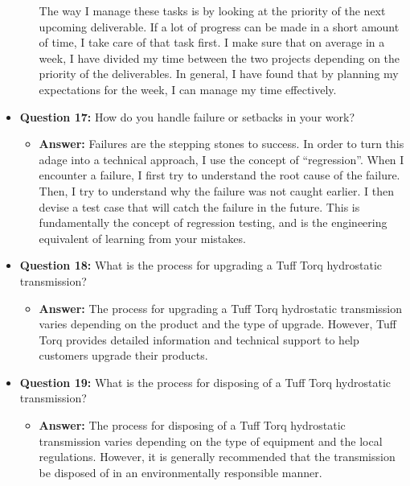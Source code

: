 \documentclass{article}
\begin{document}
\begin{itemize}
\begin{itemize}
        The way I manage these tasks is by looking at the priority of the next upcoming
        deliverable. If a lot of progress can be made in a short amount of time, I take
        care of that task first. I make sure that on average in a week, I have divided
        my time between the two projects depending on the priority of the deliverables.
        In general, I have found that by planning my expectations for the week, I can
        manage my time effectively.\\
    \end{itemize}
    
    \item \textbf{Question 17:} How do you handle failure or setbacks in your work?
    \begin{itemize}
        \item \textbf{Answer:} Failures are the stepping stones to success. In order
        to turn this adage into a technical approach, I use the concept of ``regression''.
        When I encounter a failure, I first try to understand the root cause of the failure.
        Then, I try to understand why the failure was not caught earlier. I then devise
        a test case that will catch the failure in the future. This is fundamentally
        the concept of regression testing, and is the engineering equivalent of
        learning from your mistakes.\\
    \end{itemize}
    
    \item \textbf{Question 18:} What is the process for upgrading a Tuff Torq hydrostatic transmission?
    \begin{itemize}
        \item \textbf{Answer:} The process for upgrading a Tuff Torq hydrostatic transmission varies depending on the product and the type of upgrade. However, Tuff Torq provides detailed information and technical support to help customers upgrade their products.
    \end{itemize}
    
    \item \textbf{Question 19:} What is the process for disposing of a Tuff Torq hydrostatic transmission?
    \begin{itemize}
        \item \textbf{Answer:} The process for disposing of a Tuff Torq hydrostatic transmission varies depending on the type of equipment and the local regulations. However, it is generally recommended that the transmission be disposed of in an environmentally responsible manner.
    \end{itemize}
    

\end{itemize}
\end{document}
